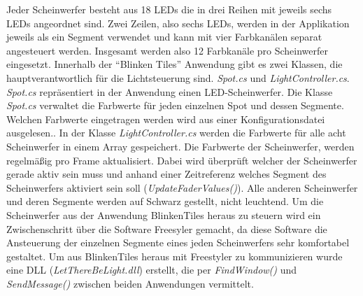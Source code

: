 Jeder Scheinwerfer besteht aus 18 LEDs die in drei Reihen mit jeweils sechs LEDs angeordnet sind. Zwei Zeilen, also sechs LEDs, werden in der Applikation jeweils als ein Segment verwendet und  kann mit vier Farbkanälen separat angesteuert werden. Insgesamt werden also 12 Farbkanäle pro Scheinwerfer eingesetzt. Innerhalb der \enquote{Blinken Tiles} Anwendung gibt es zwei Klassen, die hauptverantwortlich für die Lichtsteuerung sind. \emph{Spot.cs} und \emph{LightController.cs}. \emph{Spot.cs} repräsentiert in der Anwendung einen LED-Scheinwerfer. Die Klasse \emph{Spot.cs} verwaltet die Farbwerte für jeden einzelnen Spot und dessen Segmente. Welchen Farbwerte eingetragen werden wird aus einer Konfigurationsdatei ausgelesen.. In der Klasse \emph{LightController.cs} werden die Farbwerte für alle acht Scheinwerfer in einem Array gespeichert. Die Farbwerte der Scheinwerfer, werden regelmäßig pro Frame aktualisiert. Dabei wird überprüft welcher der Scheinwerfer gerade aktiv sein muss und anhand einer Zeitreferenz welches Segment des Scheinwerfers aktiviert sein soll (\emph{UpdateFaderValues()}). Alle anderen Scheinwerfer und deren Segmente werden auf Schwarz gestellt, nicht leuchtend. 
Um die Scheinwerfer aus der Anwendung BlinkenTiles heraus zu steuern wird ein Zwischenschritt über die Software Freesyler gemacht, da diese Software die Ansteuerung der einzelnen Segmente eines jeden Scheinwerfers sehr komfortabel gestaltet. Um aus BlinkenTiles heraus mit Freestyler zu kommunizieren wurde eine DLL (\emph{LetThereBeLight.dll}) erstellt, die per \emph{FindWindow()} und \emph{SendMessage()} zwischen beiden Anwendungen vermittelt.


